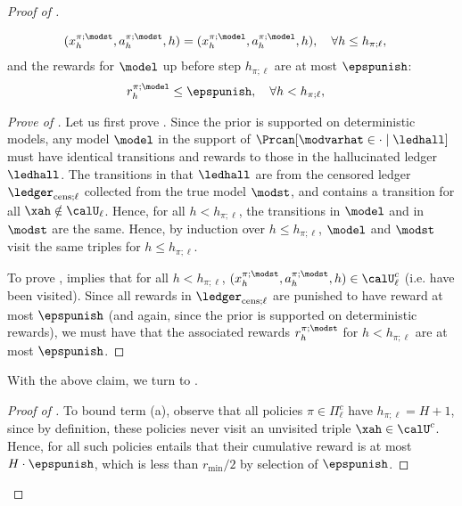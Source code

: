 \begin{proof}[Proof of ]
\begin{lemma}
\begin{align}
 &(x_{h}^{\pi;\modst},a_h^{\pi;\modst},h) = (x_{h}^{\pi;\model},a_h^{\pi;\model},h), \quad
 \forall h \le h_{\pi;\ell}, \label{eq:transition_sim}
  \end{align}
  and the rewards for $\model$ up before step $h_{\pi;\ell}$ are at most $\epspunish$:
  \begin{align}
 &r_{h}^{\pi;\model} \le \epspunish, \quad
 \forall h < h_{\pi;\ell},  \label{eq:reward_punish}
 \end{align}
 \end{lemma}
 \begin{proof}[Prove of ]
 Let us first prove . Since the prior is supported on deterministic models, any model $\model$ in the support of $\Prcan[\modvarhat  \in \cdot \mid \ledhall]$ must have identical transitions and rewards to those in the hallucinated ledger $\ledhall$. The transitions in that $\ledhall$ are from the censored ledger $\ledcensl$ collected from the true model $\modst$, and contains a transition for all $\xah \notin \calU_{\ell}$. Hence, for all $h < h_{\pi;\ell}$, the transitions in $\model$ and in $\modst$ are the same.  Hence, by induction over $h \le h_{\pi;\ell}$, $\model$ and $\modst$ visit the same triples for $h \le h_{\pi;\ell}$.

To prove ,  implies that for all $h < h_{\pi;\ell}$, $(x_{h}^{\pi;\modst},a_h^{\pi;\modst},h) \in \calU_{\ell}^c$ (i.e. have been visited).   Since all rewards in $\ledcensl$ are punished to have reward at most $\epspunish$ (and again, since the prior is supported on deterministic rewards), we must have that the associated rewards $r_{h}^{\pi;\modst}$ for $h < h_{\pi;\ell}$ are at most $\epspunish$.
 \end{proof}

With the above claim, we turn to .
\begin{proof}[Proof of ] To bound term (a), observe that all policies $\pi \in \Pi_{\ell}^c$ have $h_{\pi;\ell} = H+1$, since by definition, these policies never visit an unvisited triple $\xah \in \calU^c$. Hence, for all such policies
 entails that their cumulative reward is at most $H \cdot \epspunish$, which is less than $r_{\min}/2$ by selection of $\epspunish$.


\end{proof}
\end{proof}
